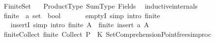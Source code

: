 %
\begin{isabellebody}%
%
%
\isadelimdocument
%
\endisadelimdocument
%
\isatagdocument
%
\isamarkuptrue%
%
\endisatagdocument
{\isafolddocument}%
%
\isadelimdocument
%
\endisadelimdocument
%
\isadelimtheory
%
\endisadelimtheory
%
\isatagtheory
{}\isamarkupfalse%
\ Finite{\isacharunderscore}{\kern0pt}Set\isanewline
\ \ \ Product{\isacharunderscore}{\kern0pt}Type\ Sum{\isacharunderscore}{\kern0pt}Type\ Fields\isanewline
{}%
\endisatagtheory
{\isafoldtheory}%
%
\isadelimtheory
%
\endisadelimtheory
%
\isadelimdocument
%
\endisadelimdocument
%
\isatagdocument
%
\isamarkuptrue%
%
\endisatagdocument
{\isafolddocument}%
%
\isadelimdocument
%
\endisadelimdocument
{}\isamarkupfalse%
\ \ {\isacharbrackleft}{\kern0pt}{\isacharbrackleft}{\kern0pt}inductive{\isacharunderscore}{\kern0pt}internals{\isacharbrackright}{\kern0pt}{\isacharbrackright}{\kern0pt}\isanewline
{}\isanewline
\isanewline
{}\isamarkupfalse%
\ finite\ {\isacharcolon}{\kern0pt}{\isacharcolon}{\kern0pt}\ {\isachardoublequoteopen}{\isacharprime}{\kern0pt}a\ set\ {\isasymRightarrow}\ bool{\isachardoublequoteclose}\isanewline
\ \ \isanewline
\ \ \ \ emptyI\ {\isacharbrackleft}{\kern0pt}simp{\isacharcomma}{\kern0pt}\ intro{\isacharbang}{\kern0pt}{\isacharbrackright}{\kern0pt}{\isacharcolon}{\kern0pt}\ {\isachardoublequoteopen}finite\ {\isacharbraceleft}{\kern0pt}{\isacharbraceright}{\kern0pt}{\isachardoublequoteclose}\isanewline
\ \ {\isacharbar}{\kern0pt}\ insertI\ {\isacharbrackleft}{\kern0pt}simp{\isacharcomma}{\kern0pt}\ intro{\isacharbang}{\kern0pt}{\isacharbrackright}{\kern0pt}{\isacharcolon}{\kern0pt}\ {\isachardoublequoteopen}finite\ A\ {\isasymLongrightarrow}\ finite\ {\isacharparenleft}{\kern0pt}insert\ a\ A{\isacharparenright}{\kern0pt}{\isachardoublequoteclose}\isanewline
\isanewline
{}\isamarkupfalse%
\isanewline
%
\isadelimML
\isanewline
%
\endisadelimML
%
\isatagML
{}\isamarkupfalse%
\ finite{\isacharunderscore}{\kern0pt}Collect\ {\isacharparenleft}{\kern0pt}{\isachardoublequoteopen}finite\ {\isacharparenleft}{\kern0pt}Collect\ P{\isacharparenright}{\kern0pt}{\isachardoublequoteclose}{\isacharparenright}{\kern0pt}\ {\isacharequal}{\kern0pt}\ {\isacartoucheopen}K\ Set{\isacharunderscore}{\kern0pt}Comprehension{\isacharunderscore}{\kern0pt}Pointfree{\isachardot}{\kern0pt}simproc{\isacartoucheclose}%

\end{isabellebody}
